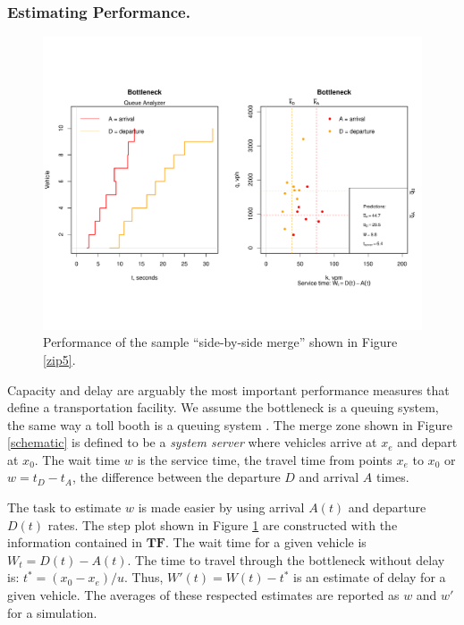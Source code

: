 \documentclass[Proceedings]{ascelike}
\begin{document}
\subsubsection{Estimating Performance.} 

\begin{figure}
\centering
\includegraphics[width = 5.5in]{Rplot13.pdf}
\caption{Performance of the sample  ``side-by-side merge'' shown in Figure \ref{zip5}.}
\label{perform5}
\end{figure}


Capacity and delay are arguably the most important performance measures that define a transportation facility.  We assume  the bottleneck is a queuing system, the same way a toll booth is a queuing system \cite{banks:1998}. The merge zone shown in Figure \ref{schematic} is defined to be a \emph{system server} where vehicles arrive at $x_e$ and depart at $x_0$. The wait  time $w$ is the service time, the  travel time from points $x_e$ to $x_0$ or  $w = t_D - t_A$, the difference between the departure $D$ and arrival $A$ times. 

The task to estimate $w$  is made easier by using arrival  $A(t)$ and departure $D(t)$ rates.  The step plot shown in Figure \ref{perform5} are constructed with the information contained in $\mathbf{TF}$. The wait time for a given vehicle is $W_t = D(t) - A(t)$. The  time to travel through the bottleneck without delay is: $t^* = (x_0 - x_e)/u$.  Thus, $W'(t) = W(t) - t^*$ is an estimate of delay for a given vehicle. The averages of these respected estimates are reported as $w$ and $w'$ for a simulation.
\end{document}
